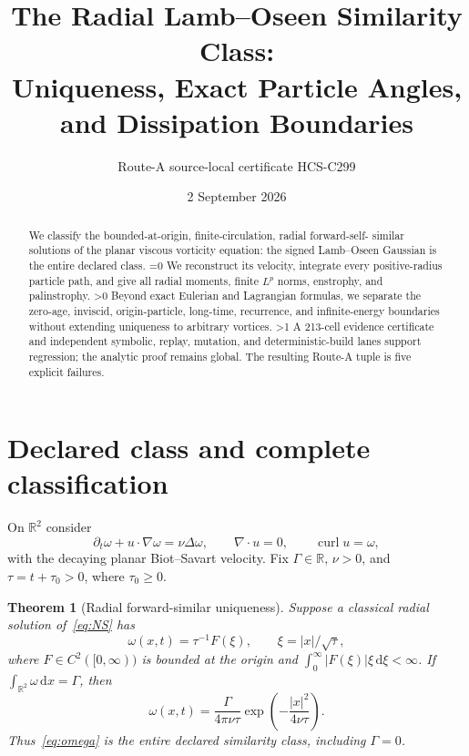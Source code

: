 \documentclass[10pt]{article}
\title{The Radial Lamb--Oseen Similarity Class:\\
Uniqueness, Exact Particle Angles, and Dissipation Boundaries}
\author{Route-A source-local certificate HCS-C299}
\date{2 September 2026}
\providecommand{\CRevisionRound}{2}
\newtheorem{theorem}{Theorem}
\newcommand{\R}{\mathbb R}
\newcommand{\dd}{\,\mathrm d}
\begin{document}
\maketitle

\begin{abstract}
We classify the bounded-at-origin, finite-circulation, radial forward-self-
similar solutions of the planar viscous vorticity equation: the signed
Lamb--Oseen Gaussian is the entire declared class.
\ifnum\CRevisionRound=0
We reconstruct its velocity, integrate every positive-radius particle path,
and give all radial moments, finite $L^p$ norms, enstrophy, and palinstrophy.
\fi
\ifnum\CRevisionRound>0
Beyond exact Eulerian and Lagrangian formulas, we separate the zero-age,
inviscid, origin-particle, long-time, recurrence, and infinite-energy
boundaries without extending uniqueness to arbitrary vortices.
\fi
\ifnum\CRevisionRound>1
A 213-cell evidence certificate and independent symbolic, replay, mutation,
and deterministic-build lanes support regression; the analytic proof remains
global.  The resulting Route-A tuple is five explicit failures.
\fi
\end{abstract}

\section{Declared class and complete classification}
On $\R^2$ consider
\begin{equation}\label{eq:NS}
 \partial_t\omega+u\cdot\nabla\omega=\nu\Delta\omega,
 \qquad \nabla\cdot u=0,\qquad \operatorname{curl}u=\omega,
\end{equation}
with the decaying planar Biot--Savart velocity.  Fix
$\Gamma\in\R$, $\nu>0$, and $\tau=t+\tau_0>0$, where $\tau_0\ge0$.

\begin{theorem}[Radial forward-similar uniqueness]\label{thm:class}
Suppose a classical radial solution of~\eqref{eq:NS} has
\begin{equation}\label{eq:ansatz}
 \omega(x,t)=\tau^{-1}F(\xi),\qquad \xi=|x|/\sqrt\tau,
\end{equation}
where $F\in C^2([0,\infty))$ is bounded at the origin and
$\int_0^\infty |F(\xi)|\xi\dd\xi<\infty$.  If
$\int_{\R^2}\omega\dd x=\Gamma$, then
\begin{equation}\label{eq:omega}
 \omega(x,t)=\frac{\Gamma}{4\pi\nu\tau}
 \exp\!\left(-\frac{|x|^2}{4\nu\tau}\right).
\end{equation}
Thus~\eqref{eq:omega} is the entire declared similarity class, including
$\Gamma=0$.
\end{theorem}
\end{document}
